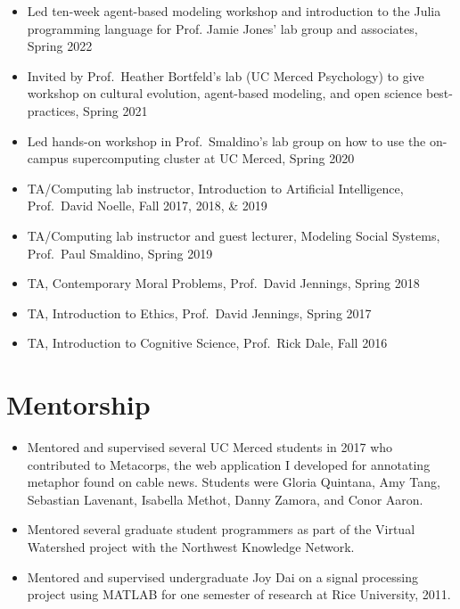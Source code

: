 \documentclass[11pt, letterpaper]{article}
\begin{document}
\begin{itemize}
  \item
   Led ten-week agent-based modeling workshop and introduction to the Julia
    programming language for Prof. Jamie Jones' lab group and associates,
    Spring 2022

  \item
   Invited by Prof.\ Heather Bortfeld's lab (UC Merced Psychology) to give workshop on cultural evolution, agent-based modeling, and open science best-practices, Spring 2021

 \item
   Led hands-on workshop in Prof.\ Smaldino's lab group on how to use the on-campus supercomputing cluster at UC Merced, Spring 2020

 \item
   TA/Computing lab instructor, Introduction to Artificial Intelligence, Prof.\ David Noelle, Fall 2017, 2018, \& 2019

 \item
   TA/Computing lab instructor and guest lecturer, Modeling Social Systems, Prof.\ Paul Smaldino, Spring 2019
 \item
   TA, Contemporary Moral Problems, Prof.\ David Jennings, Spring 2018
 \item
   TA, Introduction to Ethics, Prof.\ David Jennings, Spring 2017
 \item
   TA, Introduction to Cognitive Science, Prof.\ Rick Dale, Fall 2016

\end{itemize}

 \section*{Mentorship}

\begin{itemize}
  \item Mentored and supervised several UC Merced students in 2017 
    who contributed to
    Metacorps, the web application I developed for annotating metaphor found
    on cable news. Students were Gloria Quintana, Amy Tang, Sebastian Lavenant, Isabella Methot,
    Danny Zamora, and Conor Aaron.
  \item
    Mentored several graduate student programmers as part of the Virtual Watershed
    project with the Northwest Knowledge Network.
  \item Mentored and supervised undergraduate Joy Dai on a signal processing project using MATLAB for
    one semester of research at Rice University, 2011.
\end{itemize}
\end{document}
